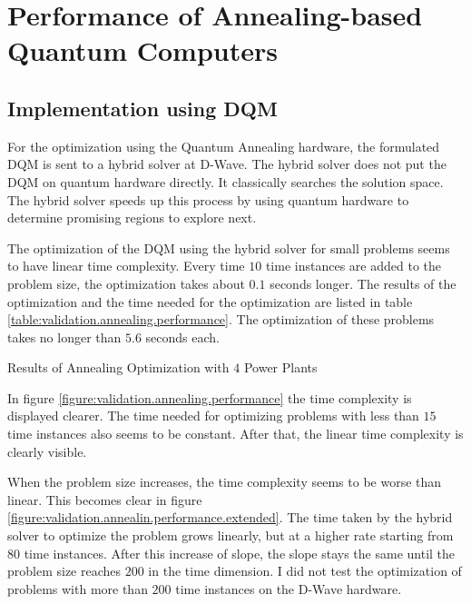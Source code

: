 \section{Performance of Annealing-based Quantum Computers}

\subsection{Implementation using DQM}

For the optimization using the Quantum Annealing hardware, the formulated DQM is sent to a hybrid solver at D-Wave.
The hybrid solver does not put the DQM on quantum hardware directly.
It classically searches the solution space.
The hybrid solver speeds up this process by using quantum hardware to determine promising regions to explore next.
\cite{DQMHybrid2020}

The optimization of the DQM using the hybrid solver for small problems seems to have linear time complexity.
Every time $10$ time instances are added to the problem size, the optimization takes about $0.1$ seconds longer.
The results of the optimization and the time needed for the optimization are listed in table \ref{table:validation.annealing.performance}.
The optimization of these problems takes no longer than $5.6$ seconds each.

\begin{table}[ht]
  \centering
  
  \caption{Results of Annealing Optimization with $4$ Power Plants}
  \label{table:validation.annealing.performance}
\end{table}

In figure \ref{figure:validation.annealing.performance} the time complexity is displayed clearer.
The time needed for optimizing problems with less than $15$ time instances also seems to be constant.
After that, the linear time complexity is clearly visible.

When the problem size increases, the time complexity seems to be worse than linear.
This becomes clear in figure \ref{figure:validation.annealin.performance.extended}.
The time taken by the hybrid solver to optimize the problem grows linearly, but at a higher rate starting from $80$ time instances.
After this increase of slope, the slope stays the same until the problem size reaches $200$ in the time dimension.
I did not test the optimization of problems with more than $200$ time instances on the D-Wave hardware.

